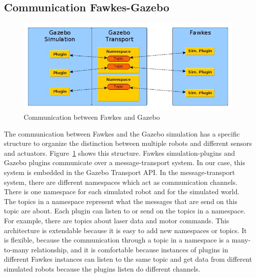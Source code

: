 \subsection{Communication Fawkes-Gazebo}
\label{sec:architecture_communication}
\begin{figure}
\includegraphics[width=\textwidth]{tabs/communication}
\caption{Communication between Fawkes and Gazebo}
\label{fig:communication}
\end{figure}
The communication between Fawkes and the Gazebo simulation has a specific structure to organize the distinction between multiple robots and different sensors and actuators. Figure~\ref{fig:communication} shows this structure. Fawkes simulation-plugins and Gazebo plugins communicate over a message-transport system. In our case, this system is embedded in the Gazebo Transport API. In the message-transport system, there are different namespaces which act as communication channels. There is one namespace for each simulated robot and for the simulated world. The topics in a namespace represent what the messages that are send on this topic are about. Each plugin can listen to or send on the topics in a namespace. For example, there are topics about laser data and motor commands. This architecture is extendable because it is easy to add new namespaces or topics. It is flexible, because the communication through a topic in a namespace is a many-to-many relationship, and it is comfortable because instances of plugins in different Fawkes instances can listen to the same topic and get data from different simulated robots because the plugins listen do different channels.


